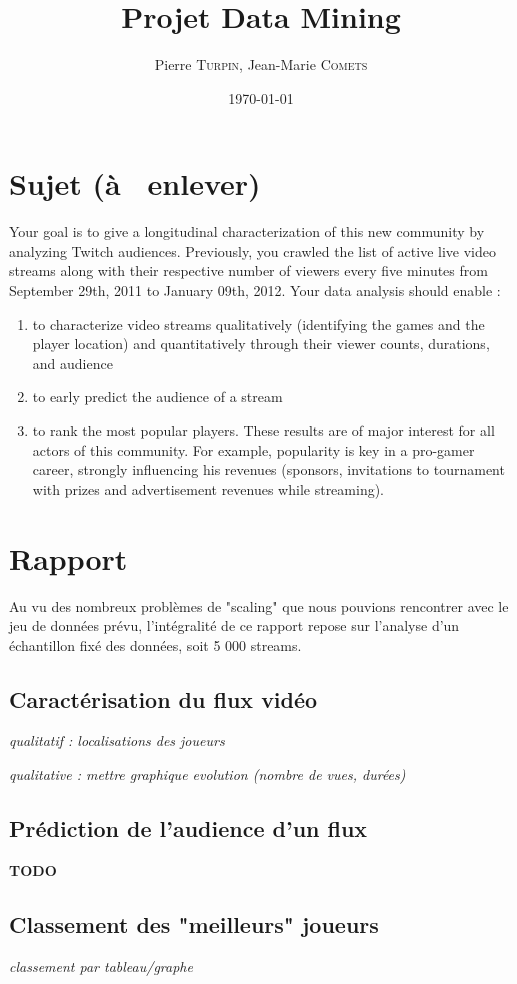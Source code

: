 \documentclass[11pt, a4paper, titlepage]{scrartcl}
\title{Projet Data Mining}
\author{Pierre \textsc{Turpin}, Jean-Marie \textsc{Comets}}
\date{\today}
\begin{document}
\maketitle
\tableofcontents
\newpage

\section{Sujet (à  enlever)}

Your goal is to give a longitudinal characterization of this new
community by analyzing Twitch audiences. Previously, you crawled the
list of active live video streams along with their respective number of
viewers every five minutes from September 29th, 2011 to January 09th,
2012. Your data analysis should enable :

\begin{enumerate}
\item
  to characterize video streams qualitatively (identifying the games and
  the player location) and quantitatively through their viewer counts,
  durations, and audience
\item
  to early predict the audience of a stream
\item
  to rank the most popular players. These results are of major interest
  for all actors of this community. For example, popularity is key in a
  pro-gamer career, strongly influencing his revenues (sponsors,
  invitations to tournament with prizes and advertisement revenues while
  streaming).
\end{enumerate}

\section{Rapport}

Au vu des nombreux problèmes de "scaling" que nous pouvions rencontrer
avec le jeu de données prévu, l'intégralité de ce rapport repose sur
l'analyse d'un échantillon fixé des données, soit 5 000 streams.

\subsection{Caractérisation du flux vidéo}

\emph{qualitatif : localisations des joueurs}

\emph{qualitative : mettre graphique evolution (nombre de vues, durées)}

\subsection{Prédiction de l'audience d'un flux}

\textbf{TODO}

\subsection{Classement des "meilleurs" joueurs}

\emph{classement par tableau/graphe}
\end{document}
